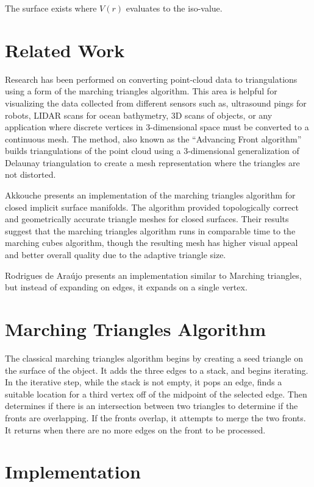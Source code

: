 \documentclass[conference]{acmsiggraph}
\begin{document}
The surface exists where $V(r)$ evaluates to the iso-value.


\section{Related Work}

Research has been performed on converting point-cloud data to triangulations
using a form of the marching triangles algorithm\cite{Scheidegger2005}. This
area is helpful for visualizing the data collected from different sensors
such as, ultrasound pings for robots, LIDAR scans for ocean bathymetry, 3D
scans of objects, or any application where discrete vertices in 3-dimensional
space must be converted to a continuous mesh. The method, also known as the
``Advancing Front algorithm'' builds triangulations of the point cloud using a
3-dimensional generalization of Delaunay triangulation to create a mesh
representation where the triangles are not distorted.

Akkouche presents an implementation of the marching triangles algorithm for
closed implicit surface manifolds\cite{Akkouche2001}. The algorithm provided
topologically correct and geometrically accurate triangle meshes for closed
surfaces. Their results suggest that the marching triangles algorithm runs in
comparable time to the marching cubes algorithm, though the resulting mesh has
higher visual appeal and better overall quality due to the adaptive triangle
size.

Rodrigues de Ara\'{u}jo presents an implementation similar to Marching
triangles, but instead of expanding on edges, it expands on a single
vertex\cite{DeAraujo2004}.

\section{Marching Triangles Algorithm}
The classical marching triangles algorithm begins by creating a seed triangle
on the surface of the object. It adds the three edges to a stack, and begins
iterating. In the iterative step, while the stack is not empty, it pops an
edge, finds a suitable location for a third vertex off of the midpoint of the
selected edge. Then determines if there is an intersection between two
triangles to determine if the fronts are overlapping. If the fronts overlap, it
attempts to merge the two fronts. It returns when there are no more edges on
the front to be processed.

\section {Implementation}
\end{document}
